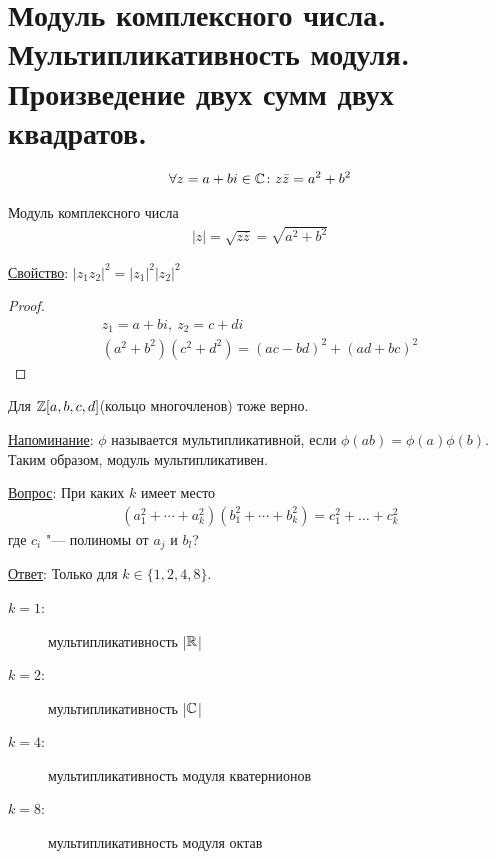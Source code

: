 \section{Модуль комплексного числа. Мультипликативность модуля. Произведение двух сумм двух квадратов.}
\begin{gather*}
\forall z = a+bi \in \mathbb{C}\colon z\bar z = a^2 + b^2 
\end{gather*}
\begin{Def}
Модуль комплексного числа
\begin{gather*}
|z| = \sqrt{z\overline{z}} = \sqrt{a^2 + b^2}
\end{gather*}
\end{Def}

\underline{Свойство}: $|z_1z_2|^2 = |z_1|^2|z_2|^2$
\begin{proof}
\begin{gather*}
z_1 = a + bi,~z_2 = c + di \\
(a^2 + b^2)(c^2 + d^2) = (ac - bd)^2 + (ad + bc)^2
\end{gather*}
\end{proof}
\begin{Rem}
	Для $\mathbb{Z}[a, b, c, d]$(кольцо многочленов) тоже верно.
\end{Rem}

\underline{Напоминание}: $\phi$ называется мультипликативной, если $\phi(ab) = \phi(a)\phi(b)$. Таким образом, модуль мультипликативен.

\underline{Вопрос}: При каких $k$ имеет место
\begin{gather*}
(a_1^2 + \cdots + a_k^2)(b_1^2 + \cdots + b_k^2) = c_1^2 + \dots + c_k^2
\end{gather*}
где $c_i$ "--- полиномы от $a_j$ и $b_l$?

\underline{Ответ}: Только для $k \in \{1, 2, 4, 8\}$.
\begin{description}
\item[$k = 1$:] мультипликативность |$\mathbb{R}$|
\item[$k = 2$:] мультипликативность |$\mathbb{C}$|
\item[$k = 4$:] мультипликативность модуля кватернионов
\item[$k = 8$:] мультипликативность модуля октав
\end{description}